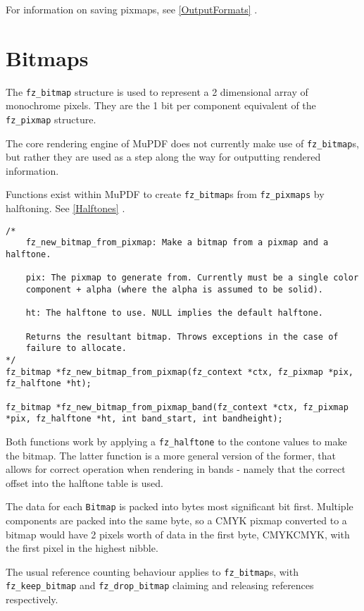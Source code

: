 \documentclass[oneside]{book}
\newcommand{\rjwref}[1] {\autoref{#1} \nameref{#1}}
\begin{document}
For information on saving pixmaps, see \rjwref{OutputFormats}.

\section{Bitmaps}
\label{Bitmaps}

The \texttt{fz\_bitmap} structure is used to represent a 2 dimensional array of monochrome pixels. They are the 1 bit per component equivalent of the \texttt{fz\_pixmap} structure.

The core rendering engine of MuPDF does not currently make use of \texttt{fz\_bitmap}s, but rather they are used as a step along the way for outputting rendered information.

Functions exist within MuPDF to create \texttt{fz\_bitmap}s from \texttt{fz\_pixmaps} by halftoning. See \rjwref{Halftones}.

\begin{lstlisting}
/*
	fz_new_bitmap_from_pixmap: Make a bitmap from a pixmap and a halftone.

	pix: The pixmap to generate from. Currently must be a single color
	component + alpha (where the alpha is assumed to be solid).

	ht: The halftone to use. NULL implies the default halftone.

	Returns the resultant bitmap. Throws exceptions in the case of
	failure to allocate.
*/
fz_bitmap *fz_new_bitmap_from_pixmap(fz_context *ctx, fz_pixmap *pix, fz_halftone *ht);

fz_bitmap *fz_new_bitmap_from_pixmap_band(fz_context *ctx, fz_pixmap *pix, fz_halftone *ht, int band_start, int bandheight);
\end{lstlisting}

Both functions work by applying a \texttt{fz\_halftone} to the contone values to make the bitmap. The latter function is a more general version of the former, that allows for correct operation when rendering in bands - namely that the correct offset into the halftone table is used.

The data for each \texttt{Bitmap} is packed into bytes most significant bit first. Multiple components are packed into the same byte, so a CMYK pixmap converted to a bitmap would have 2 pixels worth of data in the first byte, CMYKCMYK, with the first pixel in the highest nibble.

The usual reference counting behaviour applies to \texttt{fz\_bitmap}s, with \texttt{fz\_keep\_bitmap} and \texttt{fz\_drop\_bitmap} claiming and releasing references respectively.
\end{document}
